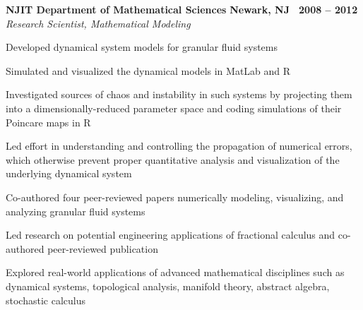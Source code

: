 \documentclass[10pt]{article}
\newcommand{\leftandright}[2]{\noindent\textbf{#1}\hfill
\textbf{#2}}
\begin{document}
\leftandright{NJIT Department of Mathematical Sciences}{Newark, NJ \textbullet\, 2008 -- 2012}\\  
\vspace{-0.8em}
\textit{Research Scientist, Mathematical Modeling} 
\begin{itemize*}
  \item Developed dynamical system models for granular fluid systems
  \item Simulated and visualized the dynamical models in MatLab and R
  \item Investigated sources of chaos and instability in such systems
    by projecting them into a dimensionally-reduced parameter space 
    and coding simulations of their Poincare maps in R 
  \item Led effort in understanding and controlling the propagation of numerical errors, 
    which otherwise prevent proper quantitative analysis and
    visualization of the underlying dynamical system
  \item Co-authored four peer-reviewed papers numerically modeling,
    visualizing, and analyzing granular fluid systems
  \item Led research on potential engineering applications of fractional calculus and
    co-authored peer-reviewed publication 
  \item Explored real-world applications of advanced mathematical disciplines such as
    dynamical systems, topological analysis, manifold theory, abstract
    algebra, stochastic calculus
\end{itemize*}
\end{document}
